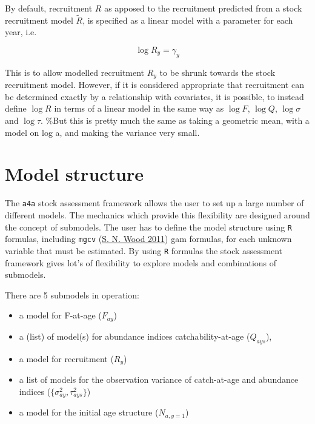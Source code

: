 \documentclass[
]{book}
\providecommand{\tightlist}{%
  \setlength{\itemsep}{0pt}\setlength{\parskip}{0pt}}
\begin{document}
By default, recruitment \(R\) as apposed to the recruitment predicted from a stock recruitment model \(\tilde{R}\), is specified as a linear model with a parameter for each year, i.e.

\begin{equation}
\log R_y = \gamma_y
\end{equation}

This is to allow modelled recruitment \(R_y\) to be shrunk towards the stock recruitment model. However, if it is considered appropriate that recruitment can be determined exactly by a relationship with covariates, it is possible, to instead define \(\log R\) in terms of a linear model in the same way as \(\log F\), \(\log Q\), \(\log \sigma\) and \(\log \tau\). \%But this is pretty much the same as taking a geometric mean, with a model on log a, and making the variance very small.

\hypertarget{model-structure}{%
\section{\texorpdfstring{Model structure \label{sec:submod}}{Model structure }}\label{model-structure}}

The \texttt{a4a} stock assessment framework allows the user to set up a large number of different models. The mechanics which provide this flexibility are designed around the concept of submodels. The user has to define the model structure using \texttt{R} formulas, including \texttt{mgcv} (\protect\hyperlink{ref-R-mgcv}{S. N. Wood 2011}) gam formulas, for each unknown variable that must be estimated. By using \texttt{R} formulas the stock assessment framework gives lot's of flexibility to explore models and combinations of submodels.

There are 5 submodels in operation:

\begin{itemize}
\tightlist
\item
  a model for F-at-age (\(F_{ay}\))
\item
  a (list) of model(s) for abundance indices catchability-at-age (\(Q_{ays}\)),
\item
  a model for recruitment (\(R_y\))
\item
  a list of models for the observation variance of catch-at-age and abundance indices (\(\{\sigma^2_{ay}, \tau^2_{ays}\}\))
\item
  a model for the initial age structure (\(N_{a,y=1}\))
\end{itemize}
\end{document}
